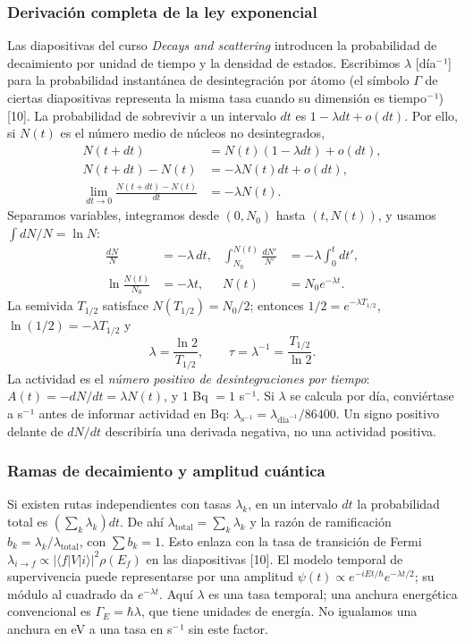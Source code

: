 \documentclass[11pt,a4paper,oneside]{article}
\begin{document}
\subsubsection{Derivación completa de la ley exponencial}\label{derivaciuxf3n-completa-de-la-ley-exponencial}

Las diapositivas del curso \emph{Decays and scattering} introducen la probabilidad de decaimiento por unidad de tiempo y la densidad de estados. Escribimos \(\lambda\) {[}día\(^{-}\)¹{]} para la probabilidad instantánea de desintegración por átomo (el símbolo \(\Gamma\) de ciertas diapositivas representa la misma tasa cuando su dimensión es tiempo\(^{-}\)¹) {[}10{]}. La probabilidad de sobrevivir a un intervalo \(dt\) es \(1-\lambda dt+o(dt)\). Por ello, si \(N(t)\) es el número medio de núcleos no desintegrados, \[\begin{aligned}
N(t+dt)&=N(t)(1-\lambda dt)+o(dt),\\
N(t+dt)-N(t)&=-\lambda N(t)dt+o(dt),\\
\lim_{dt\to0}\frac{N(t+dt)-N(t)}{dt}&=-\lambda N(t).
\end{aligned}\] Separamos variables, integramos desde \((0,N_0)\) hasta \((t,N(t))\), y usamos \(\int dN/N=\ln N\): \[\begin{aligned}
\frac{dN}{N}&=-\lambda\,dt, &
\int_{N_0}^{N(t)}\frac{dN'}{N'}&=-\lambda\int_0^t dt',\\
\ln\!\frac{N(t)}{N_0}&=-\lambda t, &N(t)&=N_0e^{-\lambda t}.
\end{aligned}\] La semivida \(T_{1/2}\) satisface \(N(T_{1/2})=N_0/2\); entonces \(1/2=e^{-\lambda T_{1/2}}\), \(\ln(1/2)=-\lambda T_{1/2}\) y \[\boxed{\lambda=\frac{\ln2}{T_{1/2}},\qquad \tau=\lambda^{-1}=\frac{T_{1/2}}{\ln2}.}\] La actividad es el \emph{número positivo de desintegraciones por tiempo}: \(A(t)=-dN/dt=\lambda N(t)\), y \(1\) Bq \(=1\) s\(^{-}\)¹. Si \(\lambda\) se calcula por día, conviértase a s\(^{-}\)¹ antes de informar actividad en Bq: \(\lambda_{\mathrm{s}^{-1}}=\lambda_{\mathrm{día}^{-1}}/86400\). Un signo positivo delante de \(dN/dt\) describiría una derivada negativa, no una actividad positiva.

\subsubsection{Ramas de decaimiento y amplitud cuántica}\label{ramas-de-decaimiento-y-amplitud-cuuxe1ntica}

Si existen rutas independientes con tasas \(\lambda_k\), en un intervalo \(dt\) la probabilidad total es \((\sum_k\lambda_k)dt\). De ahí \(\lambda_{\mathrm{total}}=\sum_k\lambda_k\) y la razón de ramificación \(b_k=\lambda_k/\lambda_{\mathrm{total}}\), con \(\sum b_k=1\). Esto enlaza con la tasa de transición de Fermi \(\lambda_{i\to f}\propto |\langle f|V|i\rangle|^2\rho(E_f)\) en las diapositivas {[}10{]}. El modelo temporal de supervivencia puede representarse por una amplitud \(\psi(t)\propto e^{-iEt/\hbar}e^{-\lambda t/2}\); su módulo al cuadrado da \(e^{-\lambda t}\). Aquí \(\lambda\) es una tasa temporal; una anchura energética convencional es \(\Gamma_E=\hbar\lambda\), que tiene unidades de energía. No igualamos una anchura en eV a una tasa en s\(^{-}\)¹ sin este factor.
\end{document}
